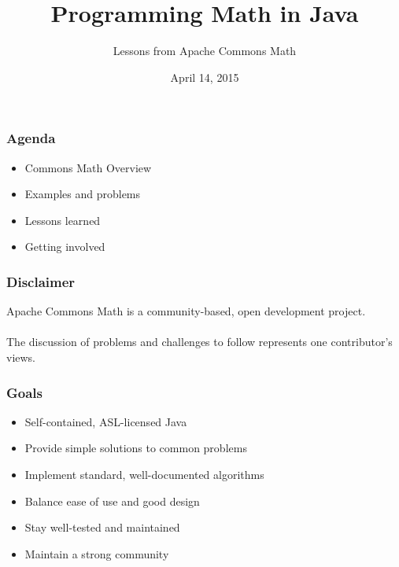 \documentclass[14pt,mathserif]{beamer}
\title{Programming Math in Java}
\subtitle{Lessons from Apache Commons Math}
\author{
  \newauthor{Phil Steitz}{psteitz@apache.org}
}
\institute[Apachecon North America 2015]{Apachecon North America 2015}
\date{April 14, 2015}
\begin{document}
{
\begin{frame} %
  \titlepage
\end{frame}
}

\begin{frame}
  \frametitle{Agenda}
\begin{itemize}
  \item Commons Math Overview
  \item Examples and problems
  \item Lessons learned
  \item Getting involved
\end{itemize}

\end{frame}

\begin{frame}
  \frametitle{Disclaimer}

Apache Commons Math is a community-based, open development project. \\~\\
The discussion of problems and challenges to follow represents one contributor's views.

\end{frame}

\begin{frame}
  \frametitle{Goals}

\begin{itemize}
  \item Self-contained, ASL-licensed Java
  \item Provide simple solutions to common problems
  \item Implement standard, well-documented algorithms
  \item Balance ease of use and good design
  \item Stay well-tested and maintained
  \item Maintain a strong community
\end{itemize}

\end{frame}


\end{document}
